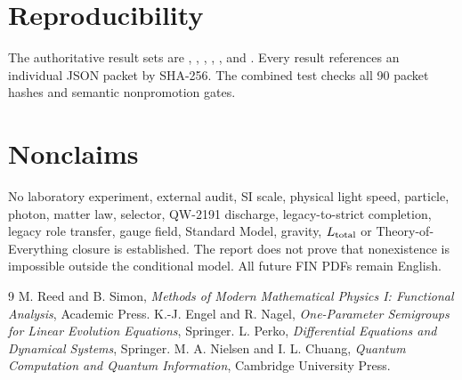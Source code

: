 \documentclass[11pt,a4paper]{article}
\begin{document}
\section{Reproducibility}

The authoritative result sets are
,
,
,
,
, and
.  Every result references an individual
JSON packet by SHA-256.  The combined test
 checks all 90 packet hashes and semantic
nonpromotion gates.

\section{Nonclaims}

No laboratory experiment, external audit, SI scale, physical light speed,
particle, photon, matter law, selector, QW-2191 discharge, legacy-to-strict
completion, legacy role transfer, gauge field, Standard Model, gravity,
$L_{\rm total}$ or Theory-of-Everything closure is established.  The report
does not prove that nonexistence is impossible outside the conditional model.
All future FIN PDFs remain English.

\begin{thebibliography}{9}
M. Reed and B. Simon, \emph{Methods of Modern Mathematical Physics I:
Functional Analysis}, Academic Press.
K.-J. Engel and R. Nagel, \emph{One-Parameter Semigroups for Linear Evolution
Equations}, Springer.
L. Perko, \emph{Differential Equations and Dynamical Systems}, Springer.
M. A. Nielsen and I. L. Chuang, \emph{Quantum Computation and Quantum
Information}, Cambridge University Press.
\end{thebibliography}
\end{document}

